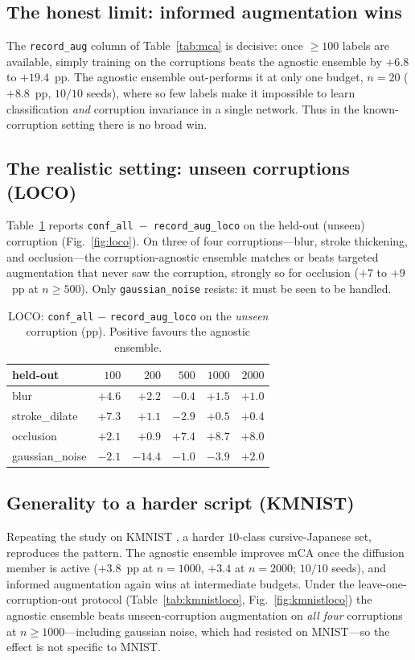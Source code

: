 \documentclass[conference]{IEEEtran}
\begin{document}
\subsection{The honest limit: informed augmentation wins}
The \texttt{record\_aug} column of Table~\ref{tab:mca} is decisive: once $\geq\!100$ labels are
available, simply training on the corruptions beats the agnostic ensemble by $+6.8$ to
$+19.4$~pp. The agnostic ensemble out-performs it at only one budget, $n\!=\!20$ ($+8.8$~pp,
$10/10$ seeds), where so few labels make it impossible to learn classification \emph{and}
corruption invariance in a single network. Thus in the known-corruption setting there is no
broad win.

\subsection{The realistic setting: unseen corruptions (LOCO)}
Table~\ref{tab:loco} reports \texttt{conf\_all}~$-$~\texttt{record\_aug\_loco} on the
held-out (unseen) corruption (Fig.~\ref{fig:loco}). On three of four corruptions---blur,
stroke thickening, and occlusion---the corruption-agnostic ensemble matches or beats targeted
augmentation that never saw the corruption, strongly so for occlusion ($+7$ to $+9$~pp at
$n\!\geq\!500$). Only \texttt{gaussian\_noise} resists: it must be seen to be handled.

\begin{table}[t]
\caption{LOCO: \texttt{conf\_all} $-$ \texttt{record\_aug\_loco} on the \emph{unseen}
         corruption (pp). Positive favours the agnostic ensemble.}
\label{tab:loco}
\centering
\begin{tabular}{@{}lrrrrr@{}}
\toprule
held-out & $100$ & $200$ & $500$ & $1000$ & $2000$ \\
\midrule
blur            & $+4.6$ & $+2.2$ & $-0.4$ & $+1.5$ & $+1.0$ \\
stroke\_dilate  & $+7.3$ & $+1.1$ & $-2.9$ & $+0.5$ & $+0.4$ \\
occlusion       & $+2.1$ & $+0.9$ & $+7.4$ & $+8.7$ & $+8.0$ \\
gaussian\_noise & $-2.1$ & $-14.4$& $-1.0$ & $-3.9$ & $+2.0$ \\
\bottomrule
\end{tabular}
\end{table}

\subsection{Generality to a harder script (KMNIST)}
Repeating the study on KMNIST \cite{Clanuwat2018}, a harder $10$-class cursive-Japanese set,
reproduces the pattern. The agnostic ensemble improves mCA once the diffusion member is active
($+3.8$~pp at $n\!=\!1000$, $+3.4$ at $n\!=\!2000$; $10/10$ seeds), and informed augmentation
again wins at intermediate budgets. Under the leave-one-corruption-out protocol
(Table~\ref{tab:kmnistloco}, Fig.~\ref{fig:kmnistloco}) the agnostic ensemble beats
unseen-corruption augmentation on \emph{all four} corruptions at $n\!\geq\!1000$---including
gaussian noise, which had resisted on MNIST---so the effect is not specific to MNIST.
\end{document}
